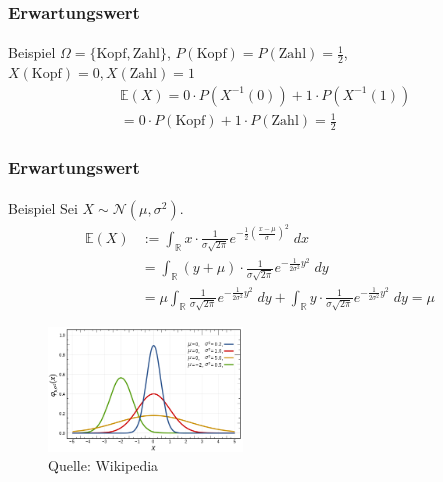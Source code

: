 \documentclass{beamer}
\begin{document}
\begin{frame}
    \frametitle{Erwartungswert}
\framesubtitle{}
\begin{block}{Beispiel}
$\Omega = \{ \text{Kopf},\text{Zahl}\}$, $P(\text{Kopf}) = P(\text{Zahl}) = \frac{1}{2}$, $X(\text{Kopf}) = 0,  X(\text{Zahl}) = 1$ 
\begin{align*}
& \mathbb{E}(X)  = 0 \cdot P(X^{-1}(0) ) + 1 \cdot P(X^{-1}(1)) \\
& =0  \cdot P(\text{Kopf}) + 1 \cdot P(\text{Zahl}) = \frac{1}{2}  
\end{align*}
\end{block}
 \end{frame}



\begin{frame}
    \frametitle{Erwartungswert}
\framesubtitle{}
\begin{block}{Beispiel}
Sei $X \sim \mathcal{N}(\mu, \sigma^2)$.
\begin{align*}
\mathbb{E}(X) & := \int_{\mathbb{R}}  x \cdot  \frac 1{\sigma \sqrt{2\pi}}e^{- \frac {1}{2 } (\frac{x- \mu}{ \sigma})^2} \; dx  \\
&= \int_{\mathbb{R}}  (y + \mu) \cdot  \frac 1{\sigma \sqrt{2\pi}}e^{- \frac {1}{2 \sigma^2} y^2} \; dy \\
 &  = \mu  \int_{\mathbb{R}}      \frac 1{\sigma \sqrt{2\pi}}e^{- \frac {1}{2 \sigma^2} y^2} \; dy  + \int_{\mathbb{R}}  y  \cdot  \frac 1{\sigma \sqrt{2\pi}}e^{- \frac {1}{2 \sigma^2} y^2} \; dy = \mu
\end{align*}
\end{block}
\begin{figure}[htp]
      \centering
    \includegraphics[width=0.46\textwidth]{img/normal}
      \caption{Quelle: Wikipedia}
\end{figure}
 \end{frame}
\end{document}
